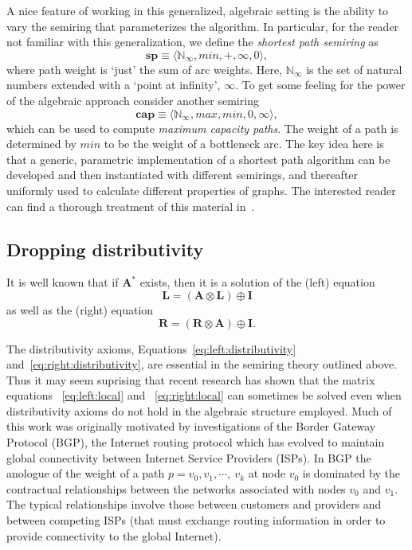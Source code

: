 A nice feature of working in this generalized, algebraic setting is
the ability to vary the semiring that parameterizes the algorithm.
In particular, for the reader not familiar with this generalization,
we define the \emph{shortest path semiring} as
\begin{equation}
\label{eq:def:sp}
\mathbf{sp} \equiv \langle\mathbb{N}_{\infty}, min, +, \infty, 0\rangle,
\end{equation}
where path weight is `just' the sum of arc weights.
Here, $\mathbb{N}_{\infty}$ is the set of natural numbers extended with a `point
at infinity', $\infty$.
To get some feeling for the power of the
algebraic approach consider another semiring
\begin{equation}
\label{eq:def:cap}
\mathbf{cap} \equiv \langle\mathbb{N}_{\infty}, max, min, 0, \infty\rangle,
\end{equation}
which can be used to compute \emph{maximum capacity paths}.
The weight of a path is determined by $min$ to be the
weight of a bottleneck arc.
The key idea here is that a generic, parametric implementation of a shortest
path algorithm can be developed and then instantiated with
different semirings, and thereafter uniformly used to calculate different properties
of graphs.
The interested reader can find a thorough treatment of
this material in~\cite{gondran_graphs_2008}.

\subsection{Dropping distributivity}
\label{subsect.dropping.distributivity}

It is well known that if $\mathbf{A}^*$ exists, then it
is a solution of the (left) equation
\begin{equation}
\label{eq:left:local}
\mathbf{L} = (\mathbf{A}\otimes \mathbf{L}) \oplus \mathbf{I}
\end{equation}
as well as the (right) equation
\begin{equation}
\label{eq:right:local}
\mathbf{R} = (\mathbf{R}\otimes \mathbf{A}) \oplus \mathbf{I}.
\end{equation}

The distributivity axioms,
Equations~\ref{eq:left:distributivity} and~\ref{eq:right:distributivity},
are essential in the semiring theory outlined above.
Thus it may seem suprising that recent research has shown that
the matrix equations ~\ref{eq:left:local} and ~\ref{eq:right:local}
can sometimes be solved even when
distributivity axioms do not hold in the algebraic structure employed.
Much of this work was originally motivated
by investigations of the Border Gateway Protocol (BGP),
the Internet routing protocol which has evolved to
maintain global connectivity between Internet Service Providers (ISPs).
In BGP the anologue of the weight of a path
$p = v_0, v_1, \cdots,\ v_k$ at node $v_0$
is dominated by the contractual relationships between
the networks associated with nodes $v_0$ and $v_1$.
The typical relationships involve those between customers
and providers and between competing ISPs (that must exchange
routing information in order to provide connectivity to
the global Internet).

